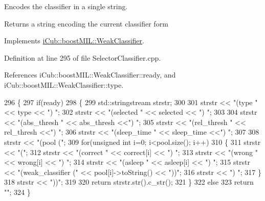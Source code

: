 Encodes the classifier in a single string. 

\begin{DoxyReturn}{Returns}
a string encoding the current classifier form 
\end{DoxyReturn}


Implements \hyperlink{classiCub_1_1boostMIL_1_1WeakClassifier_a980cd41ba074e3bdbfec697e7bee06f0}{i\+Cub\+::boost\+M\+I\+L\+::\+Weak\+Classifier}.



Definition at line 295 of file Selector\+Classifier.\+cpp.



References i\+Cub\+::boost\+M\+I\+L\+::\+Weak\+Classifier\+::ready, and i\+Cub\+::boost\+M\+I\+L\+::\+Weak\+Classifier\+::type.


\begin{DoxyCode}
296 \{
297     \textcolor{keywordflow}{if}(ready)
298     \{
299         std::stringstream strstr;
300 
301         strstr << \textcolor{stringliteral}{"(type "} << type << \textcolor{stringliteral}{") "};
302         strstr << \textcolor{stringliteral}{"(selected "} << selected << \textcolor{stringliteral}{") "};
303 
304         strstr << \textcolor{stringliteral}{"(abs\_thresh "} << abs\_thresh <<\textcolor{stringliteral}{") "};
305         strstr << \textcolor{stringliteral}{"(rel\_thresh "} << rel\_thresh <<\textcolor{stringliteral}{") "};
306         strstr << \textcolor{stringliteral}{"(sleep\_time "} << sleep\_time <<\textcolor{stringliteral}{") "};
307 
308         strstr << \textcolor{stringliteral}{"(pool ("};
309         \textcolor{keywordflow}{for}(\textcolor{keywordtype}{unsigned} \textcolor{keywordtype}{int} i=0; i<pool.size(); i++)
310         \{
311             strstr << \textcolor{stringliteral}{"("};
312             strstr << \textcolor{stringliteral}{"(correct "} << correct[i] << \textcolor{stringliteral}{") "};
313             strstr << \textcolor{stringliteral}{"(wrong "} << wrong[i] << \textcolor{stringliteral}{") "};
314             strstr << \textcolor{stringliteral}{"(asleep "} << asleep[i] << \textcolor{stringliteral}{") "};
315             strstr << \textcolor{stringliteral}{"(weak\_classifier ("} << pool[i]->toString() << \textcolor{stringliteral}{"))"};
316             strstr << \textcolor{stringliteral}{") "};
317         \}
318         strstr << \textcolor{stringliteral}{"))"};
319 
320         \textcolor{keywordflow}{return} strstr.str().c\_str();
321     \}
322     \textcolor{keywordflow}{else}
323         \textcolor{keywordflow}{return} \textcolor{stringliteral}{""};
324 \}
\end{DoxyCode}
